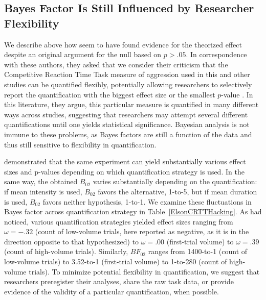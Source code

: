 \documentclass[man]{apa6}
\begin{document}
\subsection{Bayes Factor Is Still Influenced by Researcher Flexibility} 
We describe above how \citet{Elson:etal:2013} seem to have found evidence for the theorized effect despite an original argument for the null based on $p > .05$. In correspondence with these authors, they asked that we consider their criticism that the Competitive Reaction Time Task measure of aggression used in this and other studies can be quantified flexibly, potentially allowing researchers to selectively report the quantification with the biggest effect size or the smallest $p$-value \citep{Elson:etal:2014}. In this literature, they argue, this particular measure is quantified in many different ways across studies, suggesting that researchers may attempt several different quantifications until one yields statistical significance. Bayesian analysis is not immune to these problems, as Bayes factors are still a function of the data and thus still sensitive to flexibility in quantification. 

\citet{Elson:etal:2014} demonstrated that the same experiment can yield substantially various effect sizes and p-values depending on which quantification strategy is used. In the same way, the obtained $B_{02}$ varies substantially depending on the quantification: if mean intensity is used, $B_{02}$ favors the alternative, 1-to-5, but if mean duration is used, $B_{02}$ favors neither hypothesis, 1-to-1. We examine these fluctuations in Bayes factor across quantification strategy in Table~\ref{ElsonCRTTHacking}.  As \citet{Elson:etal:2014} had noticed, various quantification strategies yielded effect sizes ranging from $\omega = -.32$ (count of low-volume trials, here reported as negative, as it is in the direction opposite to that hypothesized) to $\omega = .00$ (first-trial volume) to $\omega = .39$ (count of high-volume trials). Similarly, $BF_{02}$ ranges from 1400-to-1 (count of low-volume trials) to 3.52-to-1 (first-trial volume) to 1-to-280 (count of high-volume trials). To minimize potential flexibility in quantification, we suggest that researchers preregister their analyses, share the raw task data, or provide evidence of the validity of a particular quantification, when possible. %
\end{document}
